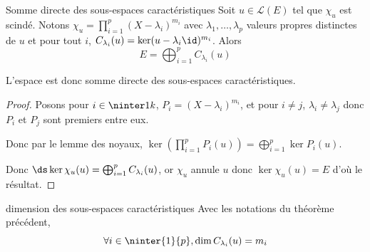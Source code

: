 \begin{theoreme}{Somme directe des sous-espaces caractéristiques}{}
    Soit $u \in \mathscr L(E)$ tel que $\chi_u$ est scindé. Notons 
    $\chi_u = \displaystyle \prod_{i = 1 }^{ p } (X - \lambda_i)^{m_i}$ avec 
    $\lambda_1, \ldots, \lambda_p$ valeurs propres distinctes de $u$
    et pour tout $i$, $C_{\lambda_i}(u) = \ker (u - \lambda_i \id)^{m_i}$.
    Alors $$E = \displaystyle \bigoplus_{i = 1 }^{ p } C_{\lambda_i}(u)$$

    L'espace est donc somme directe des sous-espaces caractéristiques.
\end{theoreme}


\begin{proof}
    Posons pour $i \in \ninter 1 k $, $P_i = (X - \lambda_i)^{m_i}$, et
    pour $i \neq j$, $\lambda_i \neq \lambda_j$ donc $P_i$ et $P_j$ sont premiers entre eux.

    Donc par le lemme des noyaux, $\displaystyle \ker \left(\prod_{i = 1 }^{ p } P_i(u) \right) = \bigoplus_{i = 1 }^{ p } \ker P_i(u)$.
    
    Donc $\ds \ker \chi_u(u) = \bigoplus_{i = 1 }^{ p } C_{\lambda_i}(u)$, or $\chi_u$ annule $u$ donc 
    $\ker \chi_u(u) = E$ d'où le résultat.

\end{proof}

\begin{corollaire}{dimension des sous-espaces caractéristiques}{}
    Avec les notations du théorème précédent, $$\forall i \in \ninter{1}{p}, 
    \dim C_{\lambda_i}(u) = m_i$$
\end{corollaire}

